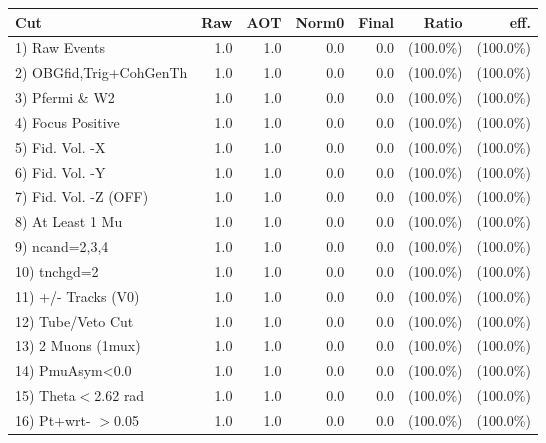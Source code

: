  \begin{table}[h!]\centering
 \begin{tabular}{||l||r|r|r|r|r|r||}
 \hline
 \hline
 Cut & Raw & AOT & Norm0 & Final & Ratio & eff.       \\
 \hline
  1) Raw Events           &          1.0 &          1.0 &          0.0 &          0.0 & (100.0\%) & (100.0\%) \\
  2) OBGfid,Trig+CohGenTh &          1.0 &          1.0 &          0.0 &          0.0 & (100.0\%) & (100.0\%) \\
  3) Pfermi \& W2         &          1.0 &          1.0 &          0.0 &          0.0 & (100.0\%) & (100.0\%) \\
  4) Focus Positive       &          1.0 &          1.0 &          0.0 &          0.0 & (100.0\%) & (100.0\%) \\
  5) Fid. Vol. -X         &          1.0 &          1.0 &          0.0 &          0.0 & (100.0\%) & (100.0\%) \\
  6) Fid. Vol. -Y         &          1.0 &          1.0 &          0.0 &          0.0 & (100.0\%) & (100.0\%) \\
  7) Fid. Vol. -Z (OFF)   &          1.0 &          1.0 &          0.0 &          0.0 & (100.0\%) & (100.0\%) \\
  8) At Least 1 Mu        &          1.0 &          1.0 &          0.0 &          0.0 & (100.0\%) & (100.0\%) \\
  9) ncand=2,3,4          &          1.0 &          1.0 &          0.0 &          0.0 & (100.0\%) & (100.0\%) \\
 10) tnchgd=2             &          1.0 &          1.0 &          0.0 &          0.0 & (100.0\%) & (100.0\%) \\
 11) +/- Tracks (V0)      &          1.0 &          1.0 &          0.0 &          0.0 & (100.0\%) & (100.0\%) \\
 12) Tube/Veto Cut        &          1.0 &          1.0 &          0.0 &          0.0 & (100.0\%) & (100.0\%) \\
 13) 2 Muons (1mux)       &          1.0 &          1.0 &          0.0 &          0.0 & (100.0\%) & (100.0\%) \\
 14) PmuAsym<0.0          &          1.0 &          1.0 &          0.0 &          0.0 & (100.0\%) & (100.0\%) \\
 15) Theta$<$2.62 rad     &          1.0 &          1.0 &          0.0 &          0.0 & (100.0\%) & (100.0\%) \\
 16) Pt+wrt- $>$0.05      &          1.0 &          1.0 &          0.0 &          0.0 & (100.0\%) & (100.0\%) \\

\end{tabular}
\end{table}

